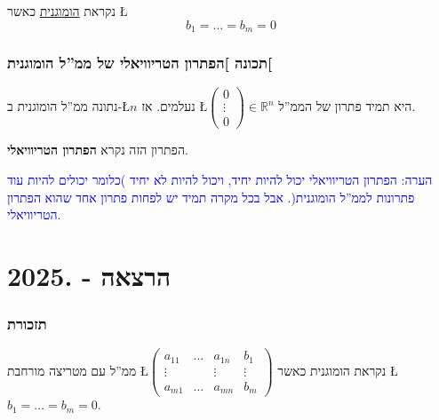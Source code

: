 \documentclass[english,hebrew]{article}
\begin{document}
נקראת \underline{הומוגנית} כאשר \L{%
\[
b_{1}=\dots=b_{m}=0
\]
}%

\section{תכונה {]}הפתרון הטריוויאלי של ממ\textquotedblright ל הומוגנית{[}}

נתונה ממ\textquotedblright ל הומוגנית ב-\L{$n$} נעלמים. אז \L{$\begin{pmatrix}0\\
\vdots\\
0
\end{pmatrix}\in\mathbb{R}^{n}$} היא תמיד פתרון של הממ\textquotedblright ל.

הפתרון הזה נקרא \textbf{הפתרון הטריוויאלי}.

\textcolor{blue}{הערה: הפתרון הטריוויאלי יכול להיות יחיד, ויכול להיות
לא יחיד )כלומר יכולים להיות עוד פתרונות לממ\textquotedblright ל הומוגנית(.
אבל בכל מקרה תמיד יש לפחות פתרון אחד שהוא הפתרון הטריוויאלי.}

\newpage{}

\noindent{}

\part{הרצאה {\endL} - {.2025\endL}}

\section{תזכורת}

ממ\textquotedblright ל עם מטריצה מורחבת \L{$\left(\begin{array}{ccc|c}
a_{11} & \dots & a_{1n} & b_{1}\\
\vdots &  & \vdots & \vdots\\
a_{m1} & \dots & a_{mn} & b_{m}
\end{array}\right)$} נקראת הומוגנית כאשר \L{$b_{1}=\dots=b_{m}=0$}.
\end{document}
